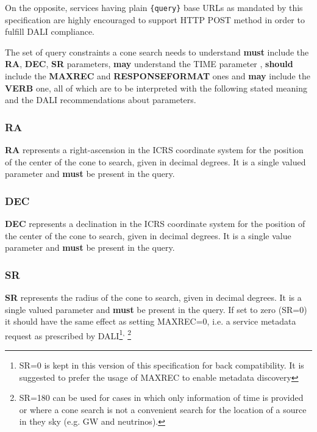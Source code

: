 \documentclass[11pt,a4paper]{ivoa} 
\begin{document}
On the opposite, services having plain \texttt{\{query\}} base URLs as
mandated by this specification are highly encouraged to support HTTP
POST method in order to fulfill DALI compliance.

The set of query constraints a cone search needs to understand
\textbf{must} include the \textbf{RA}, \textbf{DEC}, \textbf{SR}
parameters, \textbf{may} understand the TIME parameter ,
\textbf{should} include the \textbf{MAXREC} and \textbf{RESPONSEFORMAT}
ones and \textbf{may} include the \textbf{VERB} one, all of which are to
be interpreted with the following stated meaning and the DALI
recommendations about parameters.

\subsubsection{RA} \textbf{RA} represents a right-ascension in the ICRS
coordinate system for the position of the center of the cone to search,
given in decimal degrees. It is a single valued parameter and
\textbf{must} be present in the query.

\subsubsection{DEC} \textbf{DEC} represents a declination in the ICRS
coordinate system for the position of the center of the cone to search,
given in decimal degrees. It is a single value parameter and
\textbf{must} be present in the query.

\subsubsection{SR} \textbf{SR} represents the radius of the cone to
search, given in decimal degrees. It is a single valued parameter and
\textbf{must} be present in the query. If set to zero (SR=0) it should
have the same effect as setting MAXREC=0, i.e. a service metadata
request as prescribed by DALI\footnote{SR=0 is kept in this version of
this specification for back compatibility. It is suggested to prefer the
usage of MAXREC to enable metadata discovery}\textsuperscript{,
}\footnote{SR=180 can be used for cases in which only information of
time is provided or where a cone search is not a convenient search for
the location of a source in they sky (e.g. GW and neutrinos).} 
\end{document}
